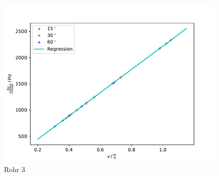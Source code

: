 \begin{figure}
  \centering
  \includegraphics[scale=0.55]{rohr3.pdf}
  \caption{Rohr 3}
  \label{fig:rohr3}
\end{figure}
\newpage
